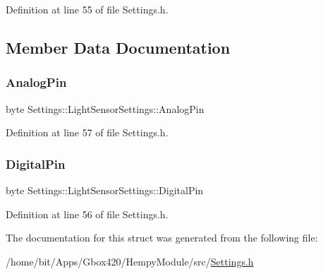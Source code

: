 Definition at line 55 of file Settings.\+h.



\subsection{Member Data Documentation}
\mbox{\label{struct_settings_1_1_light_sensor_settings_afbab965ecafd9dd0f34e361a6487c43d}} 
\subsubsection{\texorpdfstring{Analog\+Pin}{AnalogPin}}
{\footnotesize\ttfamily byte Settings\+::\+Light\+Sensor\+Settings\+::\+Analog\+Pin}



Definition at line 57 of file Settings.\+h.

\mbox{\label{struct_settings_1_1_light_sensor_settings_af1d29f3ccbb8ae9f003e426941a281e1}} 
\subsubsection{\texorpdfstring{Digital\+Pin}{DigitalPin}}
{\footnotesize\ttfamily byte Settings\+::\+Light\+Sensor\+Settings\+::\+Digital\+Pin}



Definition at line 56 of file Settings.\+h.



The documentation for this struct was generated from the following file\+:\begin{DoxyCompactItemize}
\item 
/home/bit/\+Apps/\+Gbox420/\+Hempy\+Module/src/\hyperlink{_hempy_module_2src_2_settings_8h}{Settings.\+h}\end{DoxyCompactItemize}
